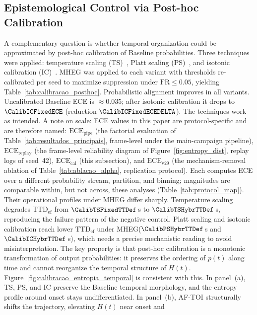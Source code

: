 \documentclass[a4paper,fleqn]{cas-dc}
\newcommand{\AFTOI}{\mbox{AF-TOI}\xspace}
\newcommand{\MHEG}{\mbox{MHEG}\xspace}
\begin{document}
\subsection{Epistemological Control via Post-hoc Calibration}
\label{sec:controle_calibracao}
A complementary question is whether temporal organization could be approximated
by post-hoc calibration of Baseline probabilities. Three techniques were
applied: temperature scaling (TS)~\cite{guo2017calibration}, Platt scaling (PS)~\cite{platt1999probabilistic},
and isotonic calibration (IC)~\cite{zadrozny2002isotonic}. \MHEG was applied to each variant with thresholds
re-calibrated per seed to maximize suppression under $\mathrm{FR} \le 0.05$,
yielding Table~\ref{tab:calibracao_posthoc}.
Probabilistic alignment improves in all variants. Uncalibrated Baseline ECE is
$\approx 0.035$; after isotonic calibration it drops to $\CalibICFixedECE$
(reduction $\CalibICFixedECEDELTA$). The techniques work as intended.
{\color{\revcolor}A note on scale: ECE values in this paper are
protocol-specific and are therefore named: $\mathrm{ECE}_{\mathrm{pipe}}$
(the factorial evaluation of Table~\ref{tab:resultados_principais},
frame-level under the main-campaign pipeline),
$\mathrm{ECE}_{\mathrm{replay}}$ (the frame-level reliability diagram of
Figure~\ref{fig:entropy_dist}, replay logs of seed~42),
$\mathrm{ECE}_{\mathrm{cal}}$ (this subsection), and
$\mathrm{ECE}_{\mathrm{v29}}$ (the mechanism-removal ablation of
Table~\ref{tab:ablacao_alpha}, replication protocol). Each computes ECE over
a different probability stream, partition, and binning; magnitudes are
comparable within, but not across, these analyses
(Table~\ref{tab:protocol_map}).}
Their operational profiles under \MHEG differ sharply. Temperature scaling
degrades $\mathrm{TTD}_{\mathrm{ef}}$ from $\CalibTSFixedTTDef$\,s to
$\CalibTSHybrTTDef$\,s, reproducing the failure pattern of the negative control.
Platt scaling and isotonic calibration reach lower $\mathrm{TTD}_{\mathrm{ef}}$
under \MHEG ($\CalibPSHybrTTDef$\,s and $\CalibICHybrTTDef$\,s), which needs a
precise mechanistic reading to avoid misinterpretation.
The key property is that post-hoc calibration is a monotonic transformation of
output probabilities: it preserves the ordering of $p(t)$ along time and cannot
reorganize the temporal structure of $H(t)$.
Figure~\ref{fig:calibracao_entropia_temporal} is consistent with this. In
panel~(a), TS, PS, and IC preserve the Baseline temporal morphology, and the
entropy profile around onset stays undifferentiated. In panel~(b), \AFTOI
structurally shifts the trajectory, elevating $H(t)$ near onset and
\end{document}
